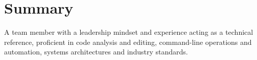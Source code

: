 \section{Summary}
\vspace{.5em}

A team member with a leadership mindset and experience acting as a technical
reference, proficient in code analysis and editing, command-line operations and
automation, systems architectures and industry standards.

